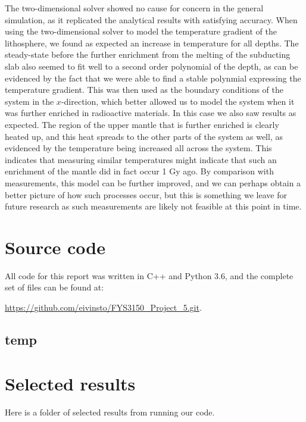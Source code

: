\documentclass[reprint,english,notitlepage]{revtex4-1}  %
\begin{document}
The two-dimensional solver showed no cause for concern in the general simulation, as it replicated the analytical results with satisfying accuracy. When using the two-dimensional solver to model the temperature gradient of the lithosphere, we found as expected an increase in temperature for all depths. The steady-state before the further enrichment from the melting of the subducting slab also seemed to fit well to a second order polynomial of the depth, as can be evidenced by the fact that we were able to find a stable polynmial expressing the temperature gradient. This was then used as the boundary conditions of the system in the $x$-direction, which better allowed us to model the system when it was further enriched in radioactive materials. In this case we also saw results as expected. The region of the upper mantle that is further enriched is clearly heated up, and this heat spreads to the other parts of the system as well, as evidenced by the temperature being increased all across the system. This indicates that measuring similar temperatures might indicate that such an enrichment of the mantle did in fact occur 1 Gy ago. By comparison with measurements, this model can be further improved, and we can perhaps obtain a better picture of how such processes occur, but this is something we leave for future research as such measurements are likely not feasible at this point in time. 



   

\onecolumngrid
{}
\newpage
\twocolumngrid

\appendix
\section{Source code} \label{A}
All code for this report was written in C++ and Python 3.6, and the complete set of files can be found at:

\url{https://github.com/eivinsto/FYS3150_Project_5.git}.

\cprotect\subsection{temp} \label{A.1}

\clearpage
\section{Selected results} \label{B}
Here is a folder of selected results from running our code.
\end{document}

